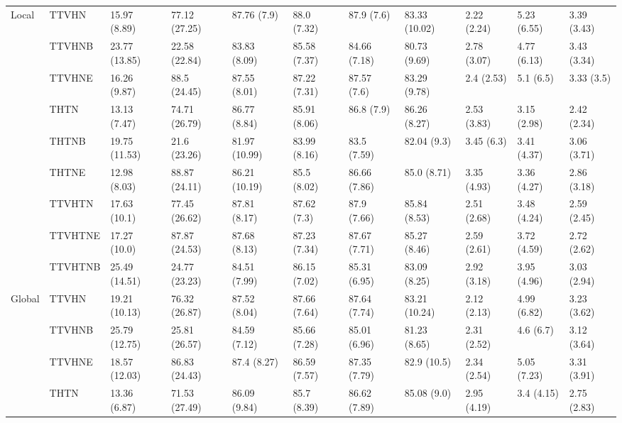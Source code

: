 \begin{table}
\begin{tabular}{lllllllllll}
Local & TTVHN &   15.97 (8.89) &  77.12 (27.25) &    87.76 (7.9) &   88.0 (7.32) &    87.9 (7.6) &  83.33 (10.02) &      2.22 (2.24) &  5.23 (6.55) &  3.39 (3.43) \\
       & TTVHNB &  23.77 (13.85) &  22.58 (22.84) &   83.83 (8.09) &  85.58 (7.37) &  84.66 (7.18) &   80.73 (9.69) &      2.78 (3.07) &  4.77 (6.13) &  3.43 (3.34) \\
       & TTVHNE &   16.26 (9.87) &   88.5 (24.45) &   87.55 (8.01) &  87.22 (7.31) &   87.57 (7.6) &   83.29 (9.78) &       2.4 (2.53) &    5.1 (6.5) &   3.33 (3.5) \\
       & THTN &   13.13 (7.47) &  74.71 (26.79) &   86.77 (8.84) &  85.91 (8.06) &    86.8 (7.9) &   86.26 (8.27) &      2.53 (3.83) &  3.15 (2.98) &  2.42 (2.34) \\
       & THTNB &  19.75 (11.53) &   21.6 (23.26) &  81.97 (10.99) &  83.99 (8.16) &   83.5 (7.59) &    82.04 (9.3) &       3.45 (6.3) &  3.41 (4.37) &  3.06 (3.71) \\
       & THTNE &   12.98 (8.03) &  88.87 (24.11) &  86.21 (10.19) &   85.5 (8.02) &  86.66 (7.86) &    85.0 (8.71) &      3.35 (4.93) &  3.36 (4.27) &  2.86 (3.18) \\
       & TTVHTN &   17.63 (10.1) &  77.45 (26.62) &   87.81 (8.17) &   87.62 (7.3) &   87.9 (7.66) &   85.84 (8.53) &      2.51 (2.68) &  3.48 (4.24) &  2.59 (2.45) \\
       & TTVHTNE &   17.27 (10.0) &  87.87 (24.53) &   87.68 (8.13) &  87.23 (7.34) &  87.67 (7.71) &   85.27 (8.46) &      2.59 (2.61) &  3.72 (4.59) &  2.72 (2.62) \\
       & TTVHTNB &  25.49 (14.51) &  24.77 (23.23) &   84.51 (7.99) &  86.15 (7.02) &  85.31 (6.95) &   83.09 (8.25) &      2.92 (3.18) &  3.95 (4.96) &  3.03 (2.94) \\
Global & TTVHN &  19.21 (10.13) &  76.32 (26.87) &   87.52 (8.04) &  87.66 (7.64) &  87.64 (7.74) &  83.21 (10.24) &      2.12 (2.13) &  4.99 (6.82) &  3.23 (3.62) \\
       & TTVHNB &  25.79 (12.75) &  25.81 (26.57) &   84.59 (7.12) &  85.66 (7.28) &  85.01 (6.96) &   81.23 (8.65) &      2.31 (2.52) &    4.6 (6.7) &  3.12 (3.64) \\
       & TTVHNE &  18.57 (12.03) &  86.83 (24.43) &    87.4 (8.27) &  86.59 (7.57) &  87.35 (7.79) &    82.9 (10.5) &      2.34 (2.54) &  5.05 (7.23) &  3.31 (3.91) \\
       & THTN &   13.36 (6.87) &  71.53 (27.49) &   86.09 (9.84) &   85.7 (8.39) &  86.62 (7.89) &    85.08 (9.0) &      2.95 (4.19) &   3.4 (4.15) &  2.75 (2.83) \\

\end{tabular}
\end{table}
